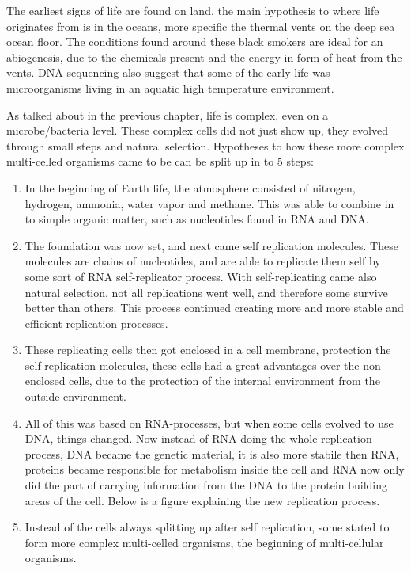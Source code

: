 The earliest signs of life are found on land, the main hypothesis to where life originates from is in the oceans, more specific the thermal vents on the deep sea ocean floor. The conditions found around these black smokers are ideal for an abiogenesis, due to the chemicals present and the energy in form of heat from the vents. DNA sequencing also suggest that some of the early life was microorganisms living in an aquatic high temperature environment.

As talked about in the previous chapter, life is complex, even on a microbe/bacteria level. These complex cells did not just show up, they evolved through small steps and natural selection. Hypotheses to how these more complex multi-celled organisms came to be can be split up in to 5 steps:

\begin{enumerate}
  \item In the beginning of Earth life, the atmosphere consisted of nitrogen, hydrogen, ammonia, water vapor and methane. This was able to combine in to simple organic matter, such as nucleotides found in RNA and DNA.
  \item The foundation was now set, and next came self replication molecules. These molecules are chains of nucleotides, and are able to replicate them self by some sort of RNA self-replicator process. With self-replicating came also natural selection, not all replications went well, and therefore some survive better than others. This process continued creating more and more stable and efficient replication processes.
  \item These replicating cells then got enclosed in a cell membrane, protection the self-replication molecules, these cells had a great advantages over the non enclosed cells, due to the protection of the internal environment from the outside environment.
  \item All of this was based on RNA-processes, but when some cells evolved to use DNA, things changed. Now instead of RNA doing the whole replication process, DNA became the genetic material, it is also more stabile then RNA, proteins became responsible for metabolism inside the cell and RNA now only did the part of carrying information from the DNA to the protein building areas of the cell. Below is a figure explaining the new replication process.
  \item Instead of the cells always splitting up after self replication, some stated to form more complex multi-celled organisms, the beginning of multi-cellular organisms.
\end{enumerate}

